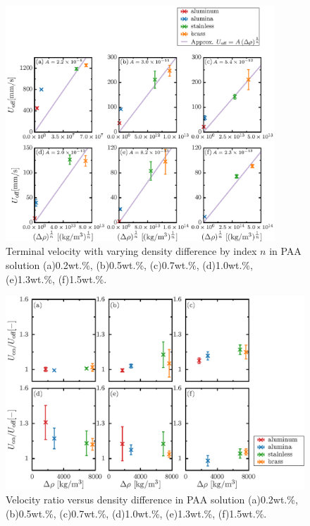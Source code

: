 \begin{figure}[ht]
    \centering
    \includegraphics[width=0.9\textwidth]{./5-Results/rhoUT_index_n.eps}
    \caption{Terminal velocity with varying density difference by index $n$ in PAA solution (a)0.2wt.\%, (b)0.5wt.\%, (c)0.7wt.\%, (d)1.0wt.\%, (e)1.3wt.\%, (f)1.5wt.\%.}
    \label{fig:rhoUT_n}
\end{figure}

\begin{figure}[ht]
    \centering
    \includegraphics[width=1.0\textwidth]{./5-Results/rhoUdiff.eps}
    \caption{Velocity ratio versus density difference in PAA solution (a)0.2wt.\%, (b)0.5wt.\%, (c)0.7wt.\%, (d)1.0wt.\%, (e)1.3wt.\%, (f)1.5wt.\%.}
    \label{fig:rhoUdiff}
\end{figure}

